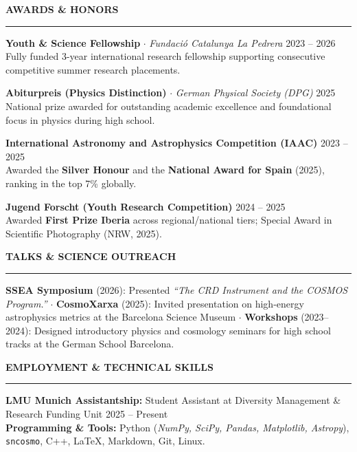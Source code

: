 \documentclass[10pt,a4paper]{article}
\newcommand{\cvsection}[1]{%
    \vspace{12pt}
    {\large\bfseries\MakeUppercase{#1}}
    \vspace{2pt}\hrule\vspace{5pt}
}
\begin{document}
\cvsection{Awards \& Honors}

\textbf{Youth \& Science Fellowship} $\cdot$ \textit{Fundació Catalunya La Pedrera} \hfill 2023 -- 2026 \\
Fully funded 3-year international research fellowship supporting consecutive competitive summer research placements.

\vspace{3pt}

\textbf{Abiturpreis (Physics Distinction)} $\cdot$ \textit{German Physical Society (DPG)} \hfill 2025 \\
National prize awarded for outstanding academic excellence and foundational focus in physics during high school.

\vspace{3pt}

\textbf{International Astronomy and Astrophysics Competition (IAAC)} \hfill 2023 -- 2025 \\
Awarded the \textbf{Silver Honour} and the \textbf{National Award for Spain} (2025), ranking in the top 7\% globally.

\vspace{3pt}

\textbf{Jugend Forscht (Youth Research Competition)} \hfill 2024 -- 2025 \\
Awarded \textbf{First Prize Iberia} across regional/national tiers; Special Award in Scientific Photography (NRW, 2025).

\cvsection{Talks \& Science Outreach}

\textbf{SSEA Symposium} (2026): Presented \textit{``The CRD Instrument and the COSMOS Program.''} $\cdot$ \textbf{CosmoXarxa} (2025): Invited presentation on high-energy astrophysics metrics at the Barcelona Science Museum $\cdot$ \textbf{Workshops} (2023--2024): Designed introductory physics and cosmology seminars for high school tracks at the German School Barcelona.

\cvsection{Employment \& Technical Skills}

\textbf{LMU Munich Assistantship:} Student Assistant at Diversity Management \& Research Funding Unit \hfill 2025 -- Present \\
\textbf{Programming \& Tools:} Python (\textit{NumPy, SciPy, Pandas, Matplotlib, Astropy}), \texttt{sncosmo}, C++, \LaTeX, Markdown, Git, Linux.
\end{document}
